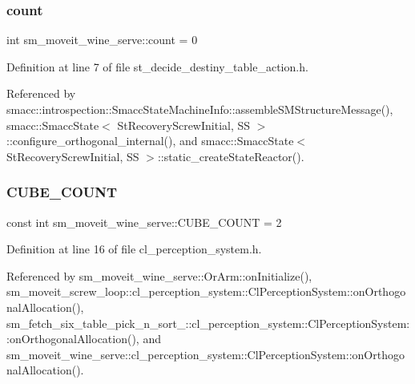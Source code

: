 \subsubsection{\texorpdfstring{count}{count}}
{\footnotesize\ttfamily int sm\+\_\+moveit\+\_\+wine\+\_\+serve\+::count = 0\hspace{0.3cm}{\ttfamily [static]}}



Definition at line 7 of file st\+\_\+decide\+\_\+destiny\+\_\+table\+\_\+action.\+h.



Referenced by smacc\+::introspection\+::\+Smacc\+State\+Machine\+Info\+::assemble\+S\+M\+Structure\+Message(), smacc\+::\+Smacc\+State$<$ St\+Recovery\+Screw\+Initial, S\+S $>$\+::configure\+\_\+orthogonal\+\_\+internal(), and smacc\+::\+Smacc\+State$<$ St\+Recovery\+Screw\+Initial, S\+S $>$\+::static\+\_\+create\+State\+Reactor().

\mbox{\label{namespacesm__moveit__wine__serve_ac6a021cad03473894d9b5adfd589f49b}} 
\subsubsection{\texorpdfstring{C\+U\+B\+E\+\_\+\+C\+O\+U\+NT}{CUBE\_COUNT}}
{\footnotesize\ttfamily const int sm\+\_\+moveit\+\_\+wine\+\_\+serve\+::\+C\+U\+B\+E\+\_\+\+C\+O\+U\+NT = 2}



Definition at line 16 of file cl\+\_\+perception\+\_\+system.\+h.



Referenced by sm\+\_\+moveit\+\_\+wine\+\_\+serve\+::\+Or\+Arm\+::on\+Initialize(), sm\+\_\+moveit\+\_\+screw\+\_\+loop\+::cl\+\_\+perception\+\_\+system\+::\+Cl\+Perception\+System\+::on\+Orthogonal\+Allocation(), sm\+\_\+fetch\+\_\+six\+\_\+table\+\_\+pick\+\_\+n\+\_\+sort\+\_\+::cl\+\_\+perception\+\_\+system\+::\+Cl\+Perception\+System\+::on\+Orthogonal\+Allocation(), and sm\+\_\+moveit\+\_\+wine\+\_\+serve\+::cl\+\_\+perception\+\_\+system\+::\+Cl\+Perception\+System\+::on\+Orthogonal\+Allocation().

\mbox{\label{namespacesm__moveit__wine__serve_adaca9c235c0d76019ef6ff08dd32977c}} 
